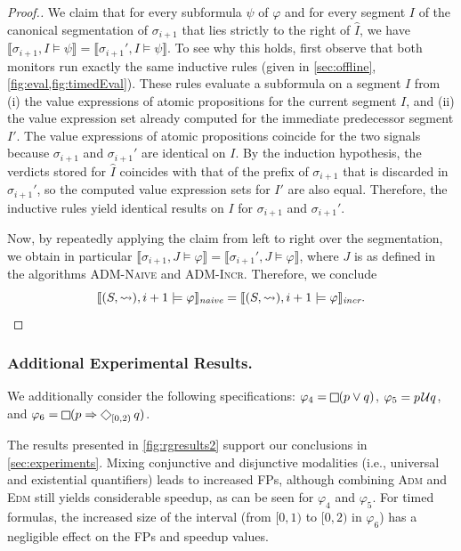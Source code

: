 \begin{proof}[\normalsize Proof.]
	We claim that for every subformula $\psi$ of $\varphi$ and for every segment $I$ of the canonical segmentation of $\sigma_{i+1}$ that lies strictly to the right of $\hat {I}$, we have $\llbracket \sigma_{i+1}, I \models \psi\rrbracket = \llbracket \sigma_{i+1}', I \models \psi \rrbracket$.
	To see why this holds, first observe that both monitors run exactly the same inductive rules (given in \cref{sec:offline}, \cref{fig:eval,fig:timedEval}).
	These rules evaluate a subformula on a segment $I$ from (i) the value expressions of atomic propositions for the current segment $I$, and (ii) the value expression set already computed for the immediate predecessor segment $I'$.
	The value expressions of atomic propositions coincide for the two signals because $\sigma_{i+1}$ and $\sigma_{i+1}'$ are identical on $I$.
	By the induction hypothesis, the verdicts stored for $\hat{I}$ coincides with that of the prefix of $\sigma_{i+1}$ that is discarded in $\sigma_{i+1}'$, so the computed value expression sets for $I'$ are also equal.
	Therefore, the inductive rules yield identical results on $I$ for $\sigma_{i+1}$ and $\sigma_{i+1}'$.
	
	Now, by repeatedly applying the claim from left to right over the segmentation, we
	obtain in particular $\llbracket\sigma_{i+1}, J \models \varphi \rrbracket = \llbracket \sigma_{i+1}', J \models \varphi \rrbracket$, where $J$ is as defined in the algorithms \textsc{ADM-Naive} and \textsc{ADM-Incr}.
	Therefore, we conclude
	$$\llbracket (S,\rightsquigarrow), i+1 \models \varphi \rrbracket_{\textit{naive}} = \llbracket (S,\rightsquigarrow), i+1 \models \varphi \rrbracket_{\textit{incr}}.$$
\end{proof}
\egroup


\subsubsection*{Additional Experimental Results.}


We additionally consider the following specifications:
$\varphi_4 = \LTLg (p \lor q)$, $\varphi_5 = p \kern.1em\mathcal{U} q$, and $\varphi_6 = \LTLg (p \Rightarrow \LTLf_{[0,2)} q)$.

The results presented in \cref{fig:rgresults2} support our conclusions in \cref{sec:experiments}.
Mixing conjunctive and disjunctive modalities (i.e., universal and existential quantifiers) leads to increased FPs, although combining \textsc{Adm} and \textsc{Edm} still yields considerable speedup, as can be seen for $\varphi_4$ and $\varphi_5$.
For timed formulas, the increased size of the interval (from $[0,1)$ to $[0,2)$ in $\varphi_6$) has a negligible effect on the FPs and speedup values.

